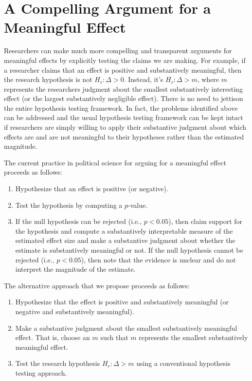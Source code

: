 \documentclass[12pt]{article}
\begin{document}
\section*{A Compelling Argument for a Meaningful Effect}

Researchers can make much more compelling and transparent arguments for meaningful effects by explicitly testing the claims we are making. For example, if  a researcher claims that an effect is positive and substantively meaningful, then the research hypothesis is not $H_r: \Delta > 0$. Instead, it's $H_r: \Delta > m$, where $m$ represents the researchers judgment about the smallest substantively interesting effect (or the largest substantively negligible effect). There is no need to jettison the entire hypothesis testing framework. In fact, the problems identified above can be addressed and the usual hypothesis testing framework can be kept intact if researchers are simply willing to apply their substantive judgment about which effects are and are not meaningful to their hypotheses rather than the estimated magnitude. 

The current practice in political science for arguing for a meaningful effect proceeds as follows:

\begin{enumerate}
\item Hypothesize that an effect is positive (or negative).
\item Test the hypothesis by computing a $p$-value. 
\item If the null hypothesis can be rejected (i.e., $p < 0.05$), then claim support for the hypothesis and compute a substantively interpretable measure of the estimated effect size and make a substantive judgment about whether the estimate is substantively meaningful or not. If the null hypothesis cannot be rejected (i.e., $p < 0.05$), then note that the evidence is unclear and do not interpret the magnitude of the estimate.
\end{enumerate}

The alternative approach that we propose proceeds as follows:

\begin{enumerate}
\item Hypothesize that the effect is positive and substantively meaningful (or negative and substantively meaningful).
\item Make a substantive judgment about the smallest substantively meaningful effect. That is, choose an $m$ such that $m$ represents the smallest substantively meaningful effect.
\item Test the research hypothesis $H_r: \Delta > m$ using a conventional hypothesis testing approach.
\end{enumerate}
\end{document}
